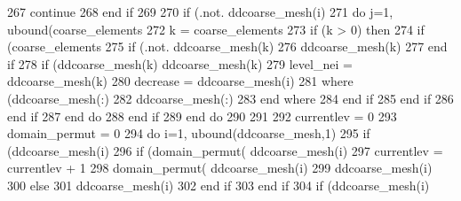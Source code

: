 \begin{DoxyCode}
267           \textcolor{keywordflow}{continue}
268 \textcolor{keywordflow}{        end if}
269 
270         \textcolor{keywordflow}{if} (.not. ddcoarse_mesh(i)%
271             \textcolor{keywordflow}{do} j=1, ubound(coarse_elements%
272               k = coarse_elements%
273               \textcolor{keywordflow}{if} (k > 0) \textcolor{keywordflow}{then} 
274                 \textcolor{keywordflow}{if} (coarse_elements%
275                   \textcolor{keywordflow}{if} (.not. ddcoarse_mesh(k)%
276                     ddcoarse_mesh(k)%
277 \textcolor{keywordflow}{                  end if}
278                   \textcolor{keywordflow}{if} (ddcoarse_mesh(k)%
      ddcoarse_mesh(k)%
279                     level\_nei = ddcoarse_mesh(k)%
280                     decrease = ddcoarse_mesh(i)%
281                     \textcolor{keywordflow}{where} (ddcoarse_mesh(:)%
282                       ddcoarse_mesh(:)%
283 \textcolor{keywordflow}{                    end where}
284 \textcolor{keywordflow}{                  end if}
285 \textcolor{keywordflow}{                end if}
286 \textcolor{keywordflow}{              end if}
287 \textcolor{keywordflow}{            end do}
288 \textcolor{keywordflow}{          end if}
289 \textcolor{keywordflow}{        end do}
290           
291      
292        currentlev = 0
293        domain\_permut = 0
294        \textcolor{keywordflow}{do} i=1, ubound(ddcoarse_mesh,1)
295         \textcolor{keywordflow}{if} (ddcoarse_mesh(i)%
296           \textcolor{keywordflow}{if} (domain\_permut( ddcoarse_mesh(i)%
297             currentlev = currentlev + 1
298             domain\_permut( ddcoarse_mesh(i)%
299             ddcoarse_mesh(i)%
300           \textcolor{keywordflow}{else}
301             ddcoarse_mesh(i)%
302 \textcolor{comment}{}\textcolor{keywordflow}{          end if}
303 \textcolor{keywordflow}{        end if}
304         \textcolor{keywordflow}{if} (ddcoarse_mesh(i)%

\end{DoxyCode}

